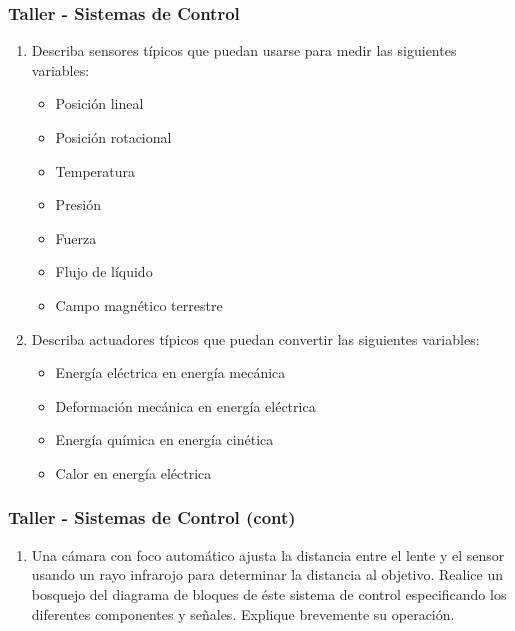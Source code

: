 \documentclass[aspectratio=169,handout]{beamer}
\theoremstyle{definition}
\theoremstyle{plain}
\theoremstyle{remark}
\newcounter{saveenumi}
\newcommand{\seti}{\setcounter{saveenumi}{\value{enumi}}}
\newcommand{\conti}{\setcounter{enumi}{\value{saveenumi}}}
\begin{document}
\begin{frame}[c]\frametitle{Taller - Sistemas de Control}
\begin{enumerate}
  \item Describa sensores típicos que puedan usarse para medir las siguientes variables:
  \begin{itemize}
    \item Posición lineal
    \item Posición rotacional
    \item Temperatura
    \item Presión
    \item Fuerza
    \item Flujo de líquido
    \item Campo magnético terrestre
  \end{itemize}
  \item Describa actuadores típicos que puedan convertir las siguientes variables:
  \begin{itemize}
    \item Energía eléctrica en energía mecánica
    \item Deformación mecánica en energía eléctrica
    \item Energía química en energía cinética
    \item Calor en energía eléctrica
  \end{itemize}
  \seti
\end{enumerate}
\end{frame}

\begin{frame}[c]\frametitle{Taller - Sistemas de Control (cont)}
\begin{enumerate}
  \conti
  \item Una cámara con foco automático ajusta la distancia entre el lente y el sensor usando un rayo infrarojo para determinar la distancia al objetivo. Realice un bosquejo del diagrama de bloques de éste sistema de control especificando los diferentes componentes y señales. Explique brevemente su operación.
  \seti
\end{enumerate}
\end{frame}
\end{document}
